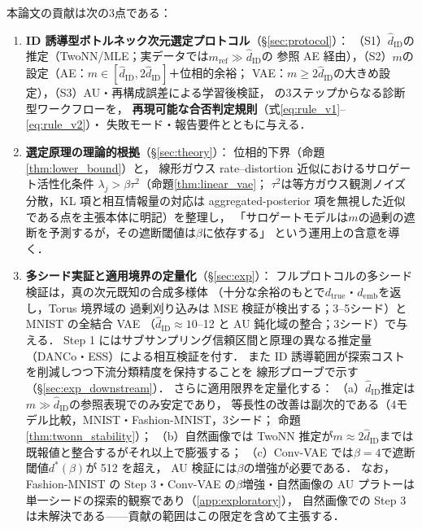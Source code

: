 \documentclass[11pt,a4paper]{jsarticle}
\newcommand{\hatdID}{\hat{d}_{\mathrm{ID}}}
\newcommand{\dtrue}{d_{\mathrm{true}}}
\newcommand{\demb}{d_{\mathrm{emb}}}
\newcommand{\dstar}{d^{*}(\beta)}
\begin{document}
本論文の貢献は次の3点である：
\begin{enumerate}
  \item \textbf{ID 誘導型ボトルネック次元選定プロトコル}（§\ref{sec:protocol}）：
        （S1）$\hatdID$の推定（TwoNN/MLE；実データでは$m_{\mathrm{ref}} \gg \hatdID$の
        参照 AE 経由），（S2）$m$の設定（AE：$m \in [\hatdID, 2\hatdID]$＋位相的余裕；
        VAE：$m \geq 2\hatdID$の大きめ設定），（S3）AU・再構成誤差による学習後検証，
        の3ステップからなる診断型ワークフローを，
        \textbf{再現可能な合否判定規則}（式\eqref{eq:rule_v1}--\eqref{eq:rule_v2}）・
        失敗モード・報告要件とともに与える．
  \item \textbf{選定原理の理論的根拠}（§\ref{sec:theory}）：
        位相的下界（命題\ref{thm:lower_bound}）と，
        線形ガウス rate--distortion 近似におけるサロゲート活性化条件
        $\lambda_j > \beta\tau^2$（命題\ref{thm:linear_vae}；
        $\tau^2$は等方ガウス観測ノイズ分散，KL 項と相互情報量の対応は
        aggregated-posterior 項を無視した近似である点を主張本体に明記）を整理し，
        「サロゲートモデルは$m$の過剰の遮断を予測するが，その遮断閾値は$\beta$に依存する」
        という運用上の含意を導く．
  \item \textbf{多シード実証と適用境界の定量化}（§\ref{sec:exp}）：
        フルプロトコルの多シード検証は，真の次元既知の合成多様体
        （十分な余裕のもとで$\dtrue$・$\demb$を返し，Torus 境界域の
        過剰刈り込みは MSE 検証が検出する；3--5シード）と MNIST の全結合 VAE
        （$\hatdID \approx 10$--12 と AU 鈍化域の整合；3シード）で与える．
        Step 1 にはサブサンプリング信頼区間と原理の異なる推定量
        （DANCo・ESS）による相互検証を付す．
        また ID 誘導範囲が探索コストを削減しつつ下流分類精度を保持することを
        線形プローブで示す（§\ref{sec:exp_downstream}）．
        さらに適用限界を定量化する：
        （a）$\hatdID$推定は$m \gg \hatdID$の参照表現でのみ安定であり，
        等長性の改善は副次的である（4モデル比較，MNIST・Fashion-MNIST，3シード；
        命題\ref{thm:twonn_stability}）；
        （b）自然画像では TwoNN 推定が$m \approx 2\hatdID$までは
        既報値\cite{pope2021intrinsic}と整合するがそれ以上で膨張する；
        （c）Conv-VAE では$\beta = 4$で遮断閾値$\dstar$が 512 を超え，
        AU 検証には$\beta$の増強が必要である．
        なお，Fashion-MNIST の Step 3・Conv-VAE の$\beta$増強・自然画像の
        AU プラトーは単一シードの探索的観察であり（\ref{app:exploratory}），
        自然画像での Step 3 は未解決である——貢献の範囲はこの限定を含めて主張する．
\end{enumerate}
\end{document}

